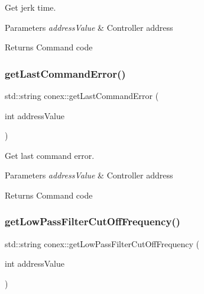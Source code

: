 Get jerk time. 


\begin{DoxyParams}{Parameters}
{\em address\+Value} & Controller address \\
\hline
\end{DoxyParams}
\begin{DoxyReturn}{Returns}
Command code 
\end{DoxyReturn}
\mbox{\label{namespaceconex_a6a993799643f4e7a19f0da530e03213e}} 
\subsubsection{\texorpdfstring{get\+Last\+Command\+Error()}{getLastCommandError()}}
{\footnotesize\ttfamily std\+::string conex\+::get\+Last\+Command\+Error (\begin{DoxyParamCaption}\item[{int}]{address\+Value }\end{DoxyParamCaption})}



Get last command error. 


\begin{DoxyParams}{Parameters}
{\em address\+Value} & Controller address \\
\hline
\end{DoxyParams}
\begin{DoxyReturn}{Returns}
Command code 
\end{DoxyReturn}
\mbox{\label{namespaceconex_acaa2df03ff5ad416b1ed256995a40966}} 
\subsubsection{\texorpdfstring{get\+Low\+Pass\+Filter\+Cut\+Off\+Frequency()}{getLowPassFilterCutOffFrequency()}}
{\footnotesize\ttfamily std\+::string conex\+::get\+Low\+Pass\+Filter\+Cut\+Off\+Frequency (\begin{DoxyParamCaption}\item[{int}]{address\+Value }\end{DoxyParamCaption})}



